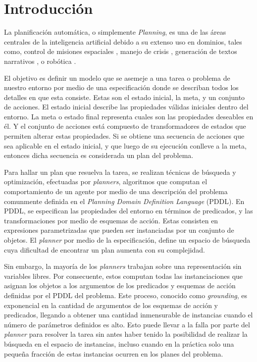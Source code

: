 \chapter{Introducción}
\label{ch:into} %

La planificación automática, o simplemente \emph{Planning}, es una de las áreas centrales de la inteligencia artificial debido a su extenso uso en dominios, tales como, control de misiones espaciales \citep{RabideauG-et-al-2001}, manejo de crisis \citep{Bienkowki-1995}, generación de textos narrativos \citep{Goudoulakis-et-al-2016}, o robótica \citep{Munoz-et-al-2016}.

El objetivo es definir un modelo que se asemeje a una tarea o problema de nuestro entorno por medio de una
especificación donde se describan todos los detalles en que esta consiste. Estas son el estado inicial, la meta, y un conjunto de acciones. El estado inicial describe las propiedades válidas iniciales dentro del entorno. La meta o estado final representa cuales son las propiedades deseables en él. Y el conjunto de acciones está
compuesto de transformadores de estados que permiten alterar estas propiedades. Si se obtiene una secuencia de acciones que sea aplicable en el estado inicial, y que luego de su ejecución conlleve a la meta, entonces dicha secuencia es considerada un plan del problema. \citep{Georgievski-et-al-2016}

Para hallar un plan que resuelva la tarea, se realizan técnicas de búsqueda y optimización, efectuadas por \emph{planners}, algoritmos que computan el comportamiento de un agente por medio de una descripción del problema comunmente definida en el \emph{Planning Domain Definition Language} (PDDL). En PDDL, se especifican las propiedades del entorno en términos de predicados, y las transformaciones por medio de esquemas de acción. Estas consisten en expresiones parametrizadas que pueden ser instanciadas por un conjunto de objetos. El \emph{planner} por medio de la especificación, define un espacio de búsqueda cuya dificultad de encontrar un plan aumenta con su complejidad. \citep{Georgievski-et-al-2016}

Sin embargo, la mayoría de los \emph{planners} trabajan sobre una representación sin variables libres. Por consecuente, estos computan todas las instanciaciones que asignan los objetos a los argumentos de los predicados y esquemas de acción definidas por el PDDL del problema. Este proceso, conocido como \emph{grounding}, es exponencial en la cantidad de argumentos de los esquemas de acción y predicados, llegando a obtener una cantidad inmensurable de instancias cuando el número de parámetros definidos es alto. Esto puede llevar a la falla por parte del \emph{planner} para resolver la tarea sin antes haber tenido la posibilidad de realizar la búsqueda en el espacio de instancias, incluso cuando en la práctica solo una pequeña fracción de estas instancias ocurren en los planes del problema. \citep{Gnad_Torralba_Dominguez_Areces_Bustos_2019}

